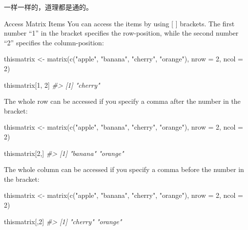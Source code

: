 \documentclass[
]{book}
\newenvironment{Shaded}{\begin{snugshade}}{\end{snugshade}}
\newcommand{\AttributeTok}[1]{\textcolor[rgb]{0.77,0.63,0.00}{#1}}
\newcommand{\CommentTok}[1]{\textcolor[rgb]{0.56,0.35,0.01}{\textit{#1}}}
\newcommand{\DecValTok}[1]{\textcolor[rgb]{0.00,0.00,0.81}{#1}}
\newcommand{\FunctionTok}[1]{\textcolor[rgb]{0.00,0.00,0.00}{#1}}
\newcommand{\NormalTok}[1]{#1}
\newcommand{\OtherTok}[1]{\textcolor[rgb]{0.56,0.35,0.01}{#1}}
\newcommand{\StringTok}[1]{\textcolor[rgb]{0.31,0.60,0.02}{#1}}
\begin{document}
一样一样的，道理都是通的。

Access Matrix Items
You can access the items by using {[} {]} brackets. The first number ``1'' in the bracket specifies the row-position, while the second number ``2'' specifies the column-position:

\begin{Shaded}
\begin{Highlighting}[]
\NormalTok{thismatrix }\OtherTok{\textless{}{-}} \FunctionTok{matrix}\NormalTok{(}\FunctionTok{c}\NormalTok{(}\StringTok{"apple"}\NormalTok{, }\StringTok{"banana"}\NormalTok{, }\StringTok{"cherry"}\NormalTok{, }\StringTok{"orange"}\NormalTok{), }\AttributeTok{nrow =} \DecValTok{2}\NormalTok{, }\AttributeTok{ncol =} \DecValTok{2}\NormalTok{)}

\NormalTok{thismatrix[}\DecValTok{1}\NormalTok{, }\DecValTok{2}\NormalTok{]}
\CommentTok{\#\textgreater{} [1] "cherry"}
\end{Highlighting}
\end{Shaded}

The whole row can be accessed if you specify a comma after the number in the bracket:

\begin{Shaded}
\begin{Highlighting}[]
\NormalTok{thismatrix }\OtherTok{\textless{}{-}} \FunctionTok{matrix}\NormalTok{(}\FunctionTok{c}\NormalTok{(}\StringTok{"apple"}\NormalTok{, }\StringTok{"banana"}\NormalTok{, }\StringTok{"cherry"}\NormalTok{, }\StringTok{"orange"}\NormalTok{), }\AttributeTok{nrow =} \DecValTok{2}\NormalTok{, }\AttributeTok{ncol =} \DecValTok{2}\NormalTok{)}

\NormalTok{thismatrix[}\DecValTok{2}\NormalTok{,]}
\CommentTok{\#\textgreater{} [1] "banana" "orange"}
\end{Highlighting}
\end{Shaded}

The whole column can be accessed if you specify a comma before the number in the bracket:

\begin{Shaded}
\begin{Highlighting}[]
\NormalTok{thismatrix }\OtherTok{\textless{}{-}} \FunctionTok{matrix}\NormalTok{(}\FunctionTok{c}\NormalTok{(}\StringTok{"apple"}\NormalTok{, }\StringTok{"banana"}\NormalTok{, }\StringTok{"cherry"}\NormalTok{, }\StringTok{"orange"}\NormalTok{), }\AttributeTok{nrow =} \DecValTok{2}\NormalTok{, }\AttributeTok{ncol =} \DecValTok{2}\NormalTok{)}

\NormalTok{thismatrix[,}\DecValTok{2}\NormalTok{]}
\CommentTok{\#\textgreater{} [1] "cherry" "orange"}
\end{Highlighting}
\end{Shaded}
\end{document}
